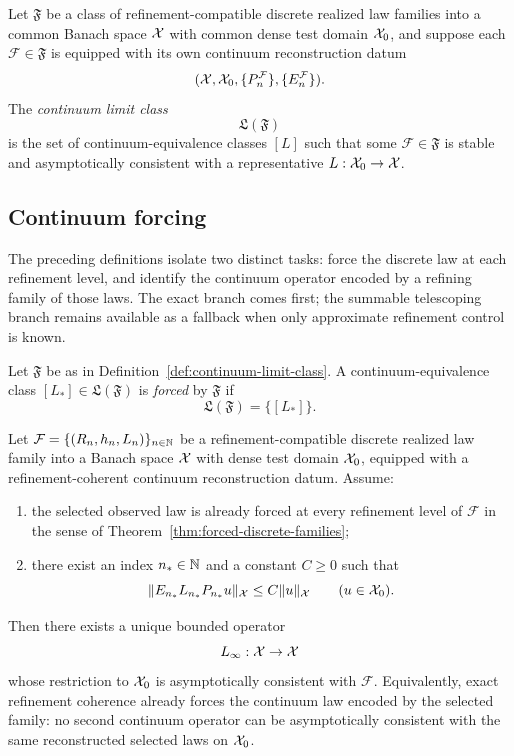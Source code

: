 \begin{definition}
\label{def:continuum-limit-class}
Let $\mathfrak F$ be a class of refinement-compatible discrete realized law
families into a common Banach space $\mathcal{X}$ with common dense test domain
$\mathcal{X}_0$, and suppose each $\mathcal F\in\mathfrak F$ is equipped with its own
continuum reconstruction datum
\[
(\mathcal{X},\mathcal{X}_0,\{P_n^{\mathcal F}\},\{E_n^{\mathcal F}\}).
\]
The \emph{continuum limit class}
\[
\mathfrak L(\mathfrak F)
\]
is the set of continuum-equivalence classes $[L]$ such that some
$\mathcal F\in\mathfrak F$ is stable and asymptotically consistent with a
representative $L:\mathcal{X}_0\to\mathcal{X}$.
\end{definition}

\subsection{Continuum forcing}

The preceding definitions isolate two distinct tasks: force the discrete law at
each refinement level, and identify the continuum operator encoded by a
refining family of those laws. The exact branch comes first; the summable
telescoping branch remains available as a fallback when only approximate
refinement control is known.

\begin{definition}
\label{def:forced-continuum-law}
Let $\mathfrak F$ be as in Definition~\ref{def:continuum-limit-class}. A
continuum-equivalence class $[L_\ast]\in \mathfrak L(\mathfrak F)$ is
\emph{forced} by $\mathfrak F$ if
\[
\mathfrak L(\mathfrak F)=\{[L_\ast]\}.
\]
\end{definition}

\begin{theorem}
\label{thm:exact-stencil-forcing-principle}
Let \(\mathcal F=\{(R_n,h_n,L_n)\}_{n\in\mathbb{N}}\) be a refinement-compatible
discrete realized law family into a Banach space \(\mathcal{X}\) with dense test
domain \(\mathcal{X}_0\), equipped with a refinement-coherent continuum reconstruction
datum. Assume:
\begin{enumerate}[label=(\roman*), leftmargin=2em, itemsep=0.2em]
\item the selected observed law is already forced at every refinement level of
      \(\mathcal F\) in the sense of
      Theorem~\ref{thm:forced-discrete-families};
\item there exist an index \(n_\ast\in\mathbb{N}\) and a constant \(C\ge 0\) such
      that
      \[
      \|E_{n_\ast}L_{n_\ast}P_{n_\ast}u\|_{\mathcal{X}}
      \le
      C\|u\|_{\mathcal{X}}
      \qquad (u\in\mathcal{X}_0).
      \]
\end{enumerate}
Then there exists a unique bounded operator
\[
L_\infty:\mathcal{X}\to\mathcal{X}
\]
whose restriction to \(\mathcal{X}_0\) is asymptotically consistent with
\(\mathcal F\). Equivalently, exact refinement coherence already forces the
continuum law encoded by the selected family: no second continuum operator can
be asymptotically consistent with the same reconstructed selected laws on
\(\mathcal{X}_0\).
\end{theorem}

